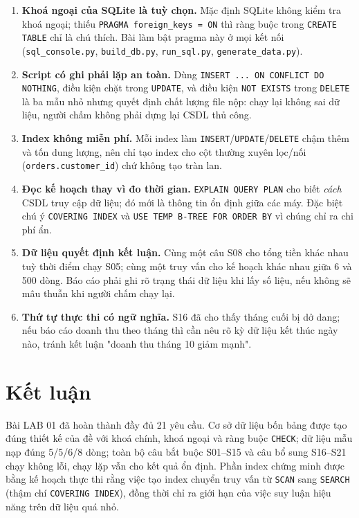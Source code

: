 \documentclass[12pt,a4paper]{article}
\newcommand{\code}[1]{\texttt{\small #1}}
\begin{document}
\begin{enumerate}[leftmargin=1.2cm,itemsep=4pt]
  \item \textbf{Khoá ngoại của SQLite là tuỳ chọn.} Mặc định SQLite không kiểm tra khoá ngoại;
        thiếu \code{PRAGMA foreign\_keys = ON} thì ràng buộc trong \code{CREATE TABLE} chỉ là
        chú thích. Bài làm bật pragma này ở mọi kết nối (\code{sql\_console.py},
        \code{build\_db.py}, \code{run\_sql.py}, \code{generate\_data.py}).
  \item \textbf{Script có ghi phải lặp an toàn.} Dùng \code{INSERT ... ON CONFLICT DO NOTHING},
        điều kiện chặt trong \code{UPDATE}, và điều kiện \code{NOT EXISTS} trong \code{DELETE} là
        ba mẫu nhỏ nhưng quyết định chất lượng file nộp: chạy lại không sai dữ liệu, người chấm
        không phải dựng lại CSDL thủ công.
  \item \textbf{Index không miễn phí.} Mỗi index làm \code{INSERT}/\code{UPDATE}/\code{DELETE}
        chậm thêm và tốn dung lượng, nên chỉ tạo index cho cột thường xuyên lọc/nối
        (\code{orders.customer\_id}) chứ không tạo tràn lan.
  \item \textbf{Đọc kế hoạch thay vì đo thời gian.} \code{EXPLAIN QUERY PLAN} cho biết
        \emph{cách} CSDL truy cập dữ liệu; đó mới là thông tin ổn định giữa các máy. Đặc biệt chú
        ý \code{COVERING INDEX} và \code{USE TEMP B-TREE FOR ORDER BY} vì chúng chỉ ra chi phí ẩn.
  \item \textbf{Dữ liệu quyết định kết luận.} Cùng một câu S08 cho tổng tiền khác nhau tuỳ thời
        điểm chạy S05; cùng một truy vấn cho kế hoạch khác nhau giữa 6 và 500 dòng. Báo cáo phải
        ghi rõ trạng thái dữ liệu khi lấy số liệu, nếu không sẽ mâu thuẫn khi người chấm chạy lại.
  \item \textbf{Thứ tự thực thi có ngữ nghĩa.} S16 đã cho thấy tháng cuối bị dở dang; nếu báo
        cáo doanh thu theo tháng thì cần nêu rõ kỳ dữ liệu kết thúc ngày nào, tránh kết luận
        "doanh thu tháng 10 giảm mạnh".
\end{enumerate}

\section{Kết luận}

Bài LAB 01 đã hoàn thành đầy đủ 21 yêu cầu. Cơ sở dữ liệu bốn bảng được tạo đúng thiết kế của đề
với khoá chính, khoá ngoại và ràng buộc \code{CHECK}; dữ liệu mẫu nạp đúng 5/5/6/8 dòng; toàn bộ
câu bắt buộc S01--S15 và câu bổ sung S16--S21 chạy không lỗi, chạy lặp vẫn cho kết quả ổn định.
Phần index chứng minh được bằng kế hoạch thực thi rằng việc tạo index chuyển truy vấn từ
\code{SCAN} sang \code{SEARCH} (thậm chí \code{COVERING INDEX}), đồng thời chỉ ra giới hạn của
việc suy luận hiệu năng trên dữ liệu quá nhỏ.
\end{document}
